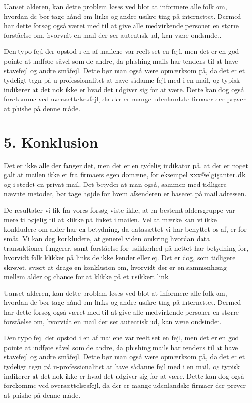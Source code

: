 \documentclass[11pt]{report}
\begin{document}
Uanset alderen, kan dette problem løses ved blot at informere alle folk om, hvordan de bør tage hånd om links og andre usikre ting på internettet. Dermed har dette forsøg også været med til at give alle medvirkende personer en større forståelse om, hvorvidt en mail der ser autentisk ud, kan være ondsindet.

Den typo fejl der opstod i en af mailene var reelt set en fejl, men det er en god pointe at indføre såvel som de andre, da phishing mails har tendens til at have stavefejl og andre småfejl. Dette bør man også være opmærksom på, da det er et tydeligt tegn på u-professionalitet at have sådanne fejl med i en mail, og typisk indikerer at det nok ikke er hvad det udgiver sig for at være. Dette kan dog også forekomme ved oversættelsesfejl, da der er mange udenlandske firmaer der prøver at phishe på denne måde.

\chapter*{5. Konklusion}
Det er ikke alle der fanger det, men det er en tydelig indikator på, at der er noget galt at mailen ikke er fra firmaets egen domæne, for eksempel xxx@elgiganten.dk og i stedet en privat mail. Det betyder at man også, sammen med tidligere nævnte metoder, bør tage højde for hvem afsenderen er baseret på mail adressen.

De resultater vi fik fra vores forsøg viste ikke, at en bestemt aldersgruppe var mere tilbøjelig til at klikke på linket i mailen. Vel at mærke kan vi ikke konkludere om alder har en betydning, da datasættet vi har benyttet os af, er for småt. Vi kan dog konkludere, at generel viden omkring hvordan data transaktioner fungerer, samt forståelse for usikkerhed på nettet har betydning for, hvorvidt folk klikker på links de ikke kender eller ej. Det er dog, som tidligere skrevet, svært at drage en konklusion om, hvorvidt der er en sammenhæng mellem alder og chance for at klikke på et usikkert link.

Uanset alderen, kan dette problem løses ved blot at informere alle folk om, hvordan de bør tage hånd om links og andre usikre ting på internettet. Dermed har dette forsøg også været med til at give alle medvirkende personer en større forståelse om, hvorvidt en mail der ser autentisk ud, kan være ondsindet.

Den typo fejl der opstod i en af mailene var reelt set en fejl, men det er en god pointe at indføre såvel som de andre, da phishing mails har tendens til at have stavefejl og andre småfejl. Dette bør man også være opmærksom på, da det er et tydeligt tegn på u-professionalitet at have sådanne fejl med i en mail, og typisk indikerer at det nok ikke er hvad det udgiver sig for at være. Dette kan dog også forekomme ved oversættelsesfejl, da der er mange udenlandske firmaer der prøver at phishe på denne måde.
\end{document}
